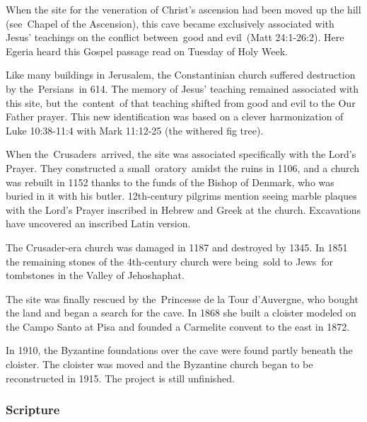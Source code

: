 \documentclass[letterpaper]{report}
\begin{document}
\begin{multicols}{2}
When the site for the veneration of Christ's ascension had been moved up the hill (see Chapel of the Ascension), this cave became exclusively associated with Jesus' teachings on the conflict between good and evil (Matt 24:1-26:2). Here Egeria heard this Gospel passage read on Tuesday of Holy Week.

Like many buildings in Jerusalem, the Constantinian church suffered destruction by the Persians in 614. The memory of Jesus' teaching remained associated with this site, but the content of that teaching shifted from good and evil to the Our Father prayer. This new identification was based on a clever harmonization of Luke 10:38-11:4 with Mark 11:12-25 (the withered fig tree).

When the Crusaders arrived, the site was associated specifically with the Lord's Prayer. They constructed a small oratory amidst the ruins in 1106, and a church was rebuilt in 1152 thanks to the funds of the Bishop of Denmark, who was buried in it with his butler. 12th-century pilgrims mention seeing marble plaques with the Lord's Prayer inscribed in Hebrew and Greek at the church. Excavations have uncovered an inscribed Latin version.

The Crusader-era church was damaged in 1187 and destroyed by 1345. In 1851 the remaining stones of the 4th-century church were being sold to Jews for tombstones in the Valley of Jehoshaphat.

The site was finally rescued by the Princesse de la Tour d'Auvergne, who bought the land and began a search for the cave. In 1868 she built a cloister modeled on the Campo Santo at Pisa and founded a Carmelite convent to the east in 1872.

In 1910, the Byzantine foundations over the cave were found partly beneath the cloister. The cloister was moved and the Byzantine church began to be reconstructed in 1915. The project is still unfinished.
\end{multicols}

\subsubsection{Scripture}
\end{document}
